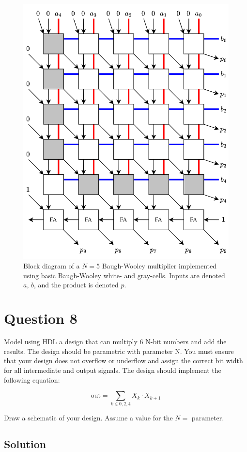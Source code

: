 \documentclass[../main.tex]{subfiles}
\begin{document}
\newpage

\begin{figure}[H]
    \centering
    \includegraphics[width=1.0\linewidth]{assets/bw_5bit_multiplier.png}
    \caption{Block diagram of a $N = 5$ Baugh-Wooley multiplier implemented using basic Baugh-Wooley white- and gray-cells. Inputs are denoted $a$, $b$, and the product is denoted $p$.}
    \label{q7}
\end{figure}

\newpage

\section{Question 8}

Model using HDL a design that can multiply 6 N-bit numbers and add the results. The design should be parametric with parameter N. You must ensure that your design does not overflow or underflow and assign the correct bit width for all intermediate and output signals. The design should implement the following equation:

$$
    \text{out} = \sum_{k \in {0, 2, 4}} X_k \cdot X_{k + 1}
$$

Draw a schematic of your design. Assume a value for the $N = $ parameter.

\subsection*{Solution}
\end{document}
